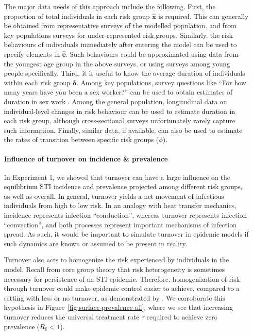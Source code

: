 \par %
The major data needs of this approach include the following.			%
First, the proportion of total individuals in each risk group $\bm{\hat{x}}$ is required.	%
This can generally be obtained from representative surveys of the modelled population,
and from key populations surveys for under-represented risk groups.
Similarly, the risk behaviours of individuals immediately after entering the model
can be used to specify elements in $\bm{\hat{e}}$.
Such behaviours could be approximated using data from the youngest age group
in the above surveys,
or using surveys among young people specifically.
Third, it is useful to know the average duration of individuals within each risk group $\bm{\delta}$.
Among key populations, survey questions like
``For how many years have you been a sex worker?''
can be used to obtain estimates of duration in sex work \citep{Watts2010}.
Among the general population,
longitudinal data on individual-level changes in risk behaviour
can be used to estimate duration in each risk group,
although cross-sectional surveys unfortunately rarely capture such information.
Finally, similar data, if available, can also be used to estimate
the rates of transition between specific risk groups ($\phi$).
\paragraph{Influence of turnover on incidence \& prevalence}
In Experiment 1, we showed that turnover can have a large influence on
the equilibrium STI incidence and prevalence
projected among different risk groups, as well as overall.
In general, turnover yields a net movement of infectious individuals
from high to low risk.
In an analogy with heat transfer mechanics,
incidence represents infection ``conduction'',
whereas turnover represents infection ``convection'',
and both processes represent important mechanisms of infection spread.
As such, it would be important to simulate turnover in epidemic models
if such dynamics are known or assumed to be present in reality.
\par
Turnover also acts to homogenize the risk experienced by individuals in the model.
Recall from core group theory that
risk heterogeneity is sometimes necessary for persistence of an STI epidemic.
Therefore, homogenization of risk through turnover
could make epidemic control easier to achieve,
compared to a setting with less or no turnover,
as demonstrated by \citet{Henry2015}.
We corroborate this hypothesis in Figure~\ref{fig:surface-prevalence-all},
where we see that increasing turnover reduces
the universal treatment rate $\tau$ required to achieve zero prevalence ($R_0 < 1$).

